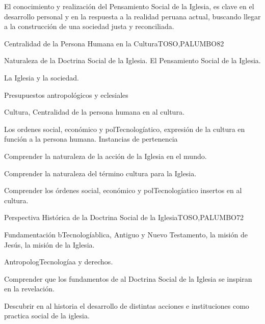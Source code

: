 \begin{syllabus}


\begin{justification}
El conocimiento y realización del Pensamiento Social de la Iglesia, es clave en el desarrollo personal 
y en la respuesta a la realidad peruana actual, buscando llegar a la construcción de una 
sociedad justa y reconciliada.
\end{justification}

\begin{goals}
\item \OutcomeFH
\end{goals}

\begin{outcomes}
\end{outcomes}

\begin{unit}{Centralidad de la Persona Humana en la Cultura}{TOSO,PALUMBO}{8}{2}
\begin{topics}
	\item Naturaleza de la Doctrina Social de la Iglesia.  El Pensamiento Social de la Iglesia.
	\item La Iglesia y la sociedad.
	\item Presupuestos antropológicos y eclesiales
	\item Cultura, Centralidad de la persona humana en al cultura.
	\item Los ordenes social, económico y polTecnologíatico, expresión de la cultura en función a la persona humana.  Instancias de pertenencia
\end{topics}
\begin{learningoutcomes}
	\item Comprender la naturaleza de la acción de la Iglesia en el mundo.
	\item Comprender la naturaleza del término cultura para la Iglesia.
	\item Comprender los órdenes social, económico y polTecnologíatico insertos en al cultura.
\end{learningoutcomes}
\end{unit}

\begin{unit}{Perspectiva Histórica de la Doctrina Social de la Iglesia}{TOSO,PALUMBO}{7}{2}
\begin{topics}
	\item Fundamentación bTecnologíablica, Antiguo y Nuevo Testamento, la misión de Jesús, la misión de la Iglesia.
	\item AntropologTecnologíaa y derechos.
\end{topics}
\begin{learningoutcomes}
	\item Comprender que los fundamentos de al Doctrina Social de la Iglesia se inspiran en la revelación.
	\item Descubrir en al historia el desarrollo de distintas acciones e instituciones como practica social de la iglesia.
\end{learningoutcomes}
\end{unit}


\end{syllabus}
